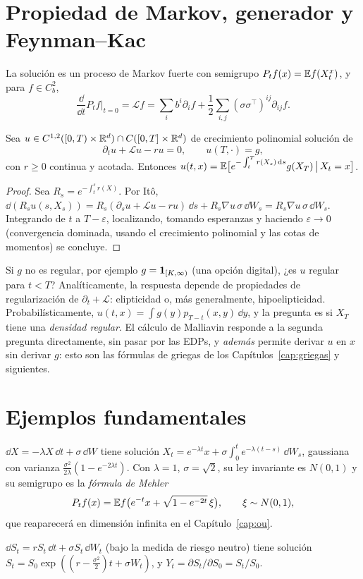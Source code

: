 \section{Propiedad de Markov, generador y Feynman--Kac}

\begin{teorema}
La solución es un proceso de Markov fuerte con semigrupo $P_tf(x)=\mathbb{E} f(X_t^x)$,
y para $f\in C_b^2$,
\[
  \frac{\dd}{\dd t}P_tf\Big|_{t=0}=\mathcal Lf=\sum_ib^i\partial_if+\frac12\sum_{i,j}(\sigma\sigma^\top)^{ij}\partial_{ij}f.
\]
\end{teorema}

\begin{teorema}
Sea $u\in C^{1,2}([0,T)\times\mathbb{R}^d)\cap C([0,T]\times\mathbb{R}^d)$ de crecimiento
polinomial solución de
\[
  \partial_tu+\mathcal Lu-ru=0,\qquad u(T,\cdot)=g,
\]
con $r\ge0$ continua y acotada. Entonces $u(t,x)=\mathbb{E}\big[e^{-\int_t^Tr(X_s)\,\mathrm{d} s}g(X_T)\,\big|\,X_t=x\big]$.
\end{teorema}

\begin{proof}
Sea $R_s=e^{-\int_t^sr(X)}$. Por Itô, $\dd(R_su(s,X_s))=R_s(\partial_su+\mathcal Lu-ru)\,\dd s+
R_s\nabla u\,\sigma\,\dd W_s=R_s\nabla u\,\sigma\,\dd W_s$. Integrando de $t$ a $T-\varepsilon$, localizando, tomando esperanzas y
haciendo $\varepsilon\to0$ (convergencia dominada, usando el crecimiento polinomial y las cotas de
momentos) se concluye.
\end{proof}

\begin{intuicion}
Si $g$ no es regular, por ejemplo $g=\mathbf{1}_{[K,\infty)}$ (una opción digital), ¿es $u$ regular para
$t<T$? Analíticamente, la respuesta depende de propiedades de regularización de
$\partial_t+\mathcal L$: elipticidad o, más generalmente, hipoelipticidad. Probabilísticamente, $u(t,x)=
\int g(y)p_{T-t}(x,y)\,\dd y$, y la pregunta es si $X_T$ tiene una \emph{densidad regular}. El cálculo de
Malliavin responde a la segunda pregunta directamente, sin pasar por las EDPs, y \emph{además}
permite derivar $u$ en $x$ sin derivar $g$: esto son las fórmulas de griegas de los Capítulos~\ref{cap:griegas}
y siguientes.
\end{intuicion}

\section{Ejemplos fundamentales}

\begin{ejemplo}
$\dd X=-\lambda X\,\dd t+\sigma\,\dd W$ tiene solución $X_t=e^{-\lambda t}x+
\sigma\int_0^te^{-\lambda(t-s)}\,\dd W_s$, gaussiana con varianza $\frac{\sigma^2}{2\lambda}(1-e^{-2\lambda t})$. Con $\lambda=1$, $\sigma=\sqrt2$, su ley invariante
es $N(0,1)$ y su semigrupo es la \emph{fórmula de Mehler}
\[
  P_tf(x)=\mathbb{E} f\big(e^{-t}x+\sqrt{1-e^{-2t}}\,\xi\big),\qquad\xi\sim N(0,1),
\]
que reaparecerá en dimensión infinita en el Capítulo~\ref{cap:ou}.
\end{ejemplo}

\begin{ejemplo}
$\dd S_t=rS_t\,\dd t+\sigma S_t\,\dd W_t$ (bajo la medida de riesgo neutro) tiene
solución $S_t=S_0\exp((r-\frac{\sigma^2}{2})t+\sigma W_t)$, y $Y_t=\partial S_t/\partial S_0=S_t/S_0$.
\end{ejemplo}
